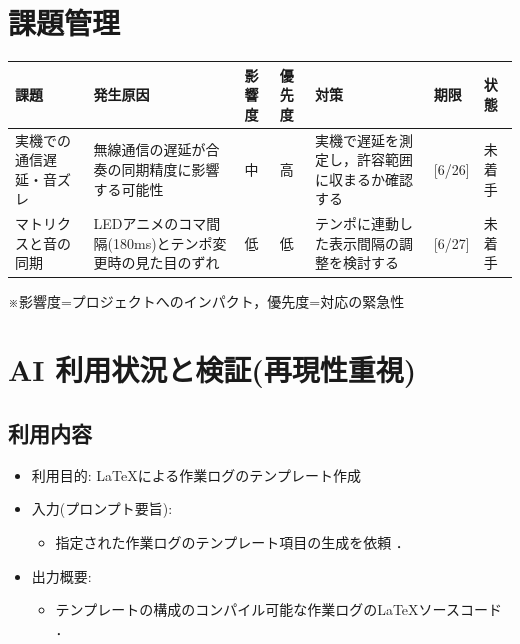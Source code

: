 \documentclass[uplatex,dvipdfmx]{jlreq}
\begin{document}
\section{課題管理}
\begin{table}[H]
    \centering
    \small
    \begin{tabular}{p{3cm}p{3cm}llp{3cm}ll}
        \toprule
        課題 & 発生原因 & 影響度 & 優先度 & 対策 & 期限 & 状態 \\
        \midrule
        実機での通信遅延・音ズレ & 無線通信の遅延が合奏の同期精度に影響する可能性 & 中 & 高 & 実機で遅延を測定し，許容範囲に収まるか確認する & [6/26] & 未着手 \\
        マトリクスと音の同期 & LEDアニメのコマ間隔(180ms)とテンポ変更時の見た目のずれ & 低 & 低 & テンポに連動した表示間隔の調整を検討する & [6/27] & 未着手 \\
        \bottomrule
    \end{tabular}
\end{table}
\vspace{0.5em}
\noindent ※影響度=プロジェクトへのインパクト，優先度=対応の緊急性

\section{AI 利用状況と検証(再現性重視)}
\subsection{利用内容}
\begin{itemize}
    \item 利用目的: \LaTeX による作業ログのテンプレート作成
    \item  入力(プロンプト要旨):
    \begin{itemize}
        \item 指定された作業ログのテンプレート項目の生成を依頼 ．
    \end{itemize}
    \item  出力概要:
    \begin{itemize}
        \item テンプレートの構成のコンパイル可能な作業ログの\LaTeX ソースコード ．
    \end{itemize}
\end{itemize}
\end{document}
